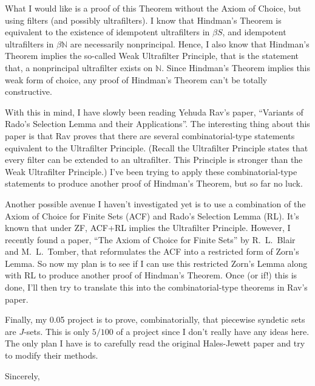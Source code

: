 \documentclass[12pt]{letter}
\theoremstyle{plain}
\theoremstyle{definition}
\newcommand{\bbN}{\mathbb{N}}
\begin{document}
\begin{letter}{}
What I would like is a proof of this Theorem without the Axiom of
Choice, but using filters (and possibly ultrafilters).
I know that Hindman's Theorem is equivalent to the existence of
idempotent ultrafilters in $\beta S$, and idempotent ultrafilters in
$\beta \bbN$ are necessarily nonprincipal.
Hence, I also know that Hindman's Theorem implies the so-called Weak
Ultrafilter Principle, that is the statement that, a nonprincipal
ultrafilter exists on $\bbN$.
Since Hindman's Theorem implies this weak form of choice, any proof of
Hindman's Theorem can't be totally constructive.  

With this in mind, I have slowly been reading Yehuda Rav's paper,
``Variants of Rado's Selection Lemma and their Applications''.
The interesting thing about this paper is that Rav proves that there
are several combinatorial-type statements equivalent to the
Ultrafilter Principle.
(Recall the Ultrafilter Principle states that every filter can be
extended to an ultrafilter.
This Principle is stronger than the Weak Ultrafilter Principle.)
I've been trying to apply these combinatorial-type statements to
produce another proof of Hindman's Theorem, but so far no luck.

Another possible avenue I haven't investigated yet is to use a
combination of the Axiom of Choice for Finite Sets (ACF) and Rado's
Selection Lemma (RL).  
It's known that under ZF, \mbox{ACF+RL} implies the Ultrafilter Principle.
However, I recently found a paper, ``The Axiom of Choice for Finite
Sets'' by R.~L.~Blair and M.~L.~Tomber, that reformulates the ACF into a
restricted form of Zorn's Lemma. 
So now my plan is to see if I can use this restricted Zorn's Lemma
along with RL to produce another proof of Hindman's Theorem.
Once (or if!) this is done, I'll then try to translate this into the
combinatorial-type theorems in Rav's paper.

Finally, my 0.05 project is to prove, combinatorially, that piecewise
syndetic sets are $J$-sets.
This is only $5/100$ of a project since I don't really have any 
ideas here.
The only plan I have is to carefully read the original Hales-Jewett
paper and try to modify their methods. 

\closing{Sincerely, }

\end{letter}
\end{document}

